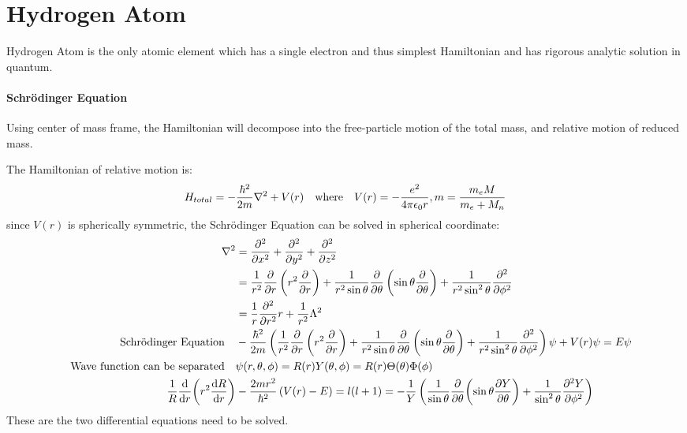 \documentclass[a4paper,10pt]{article}
\begin{document}
\section{Hydrogen Atom}
Hydrogen Atom is the only atomic element which has a single electron and thus simplest Hamiltonian and has rigorous analytic solution in quantum.
\paragraph{Schrödinger Equation}
Using center of mass frame, the Hamiltonian will decompose into the free-particle motion of the total mass, and relative motion of reduced mass.

The Hamiltonian of relative motion is:
$$H_{total}=-\frac{\hbar^2}{2m}\laplacian+V(r)\qq{where} V(r)=-\frac{e^2}{4\pi\epsilon_0r},m=\frac{m_eM}{m_e+M_n}$$
since $V(r)$ is spherically symmetric, the Schrödinger Equation can be solved in spherical coordinate:
\begin{align*}
    \laplacian                          & =\pdv[2]{x}+\pdv[2]{y}+\pdv[2]{z}                                                                                                                                                                            \\
                                        & =\frac{1}{r^2}\pdv{r}\left(r^2\pdv{r}\right)+\frac{1}{r^2\sin\theta}\pdv{\theta}\left(\sin\theta\pdv{\theta}\right)+\frac{1}{r^2\sin^2\theta}\pdv[2]{\phi}                                                   \\
                                        & =\frac{1}{r}\pdv[2]{r}r+\frac{1}{r^2}\Lambda^2                                                                                                                                                               \\
    \qq{Schrödinger Equation}           & -\frac{\hbar^2}{2m}\left(\frac{1}{r^2}\pdv{r}\left(r^2\pdv{r}\right)+\frac{1}{r^2\sin\theta}\pdv{\theta}\left(\sin\theta\pdv{\theta}\right)+\frac{1}{r^2\sin^2\theta}\pdv[2]{\phi}\right)\psi+V(r)\psi=E\psi \\
    \qq{Wave function can be separated} & \psi(r,\theta,\phi)=R(r)Y(\theta,\phi)=R(r)\Theta(\theta)\Phi(\phi)                                                                                                                                          \\
    \frac{1}{R}\dv{r}(r^2\dv{R}{r})     & -\frac{2mr^2}{\hbar^2}\left(V(r)-E\right)=l(l+1)=-\frac{1}{Y}\left(\frac{1}{\sin\theta}\pdv{\theta}(\sin\theta\pdv{Y}{\theta})+\frac{1}{\sin^2\theta}\pdv[2]{Y}{\phi}\right)
\end{align*}
These are the two differential equations need to be solved.
\end{document}
